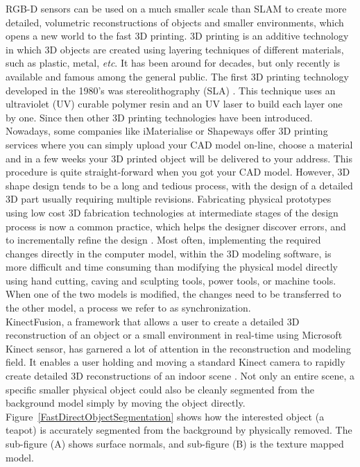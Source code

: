 RGB-D sensors can be used on a much smaller scale than SLAM to create more detailed, volumetric reconstructions of objects and smaller environments, which opens a new world to the fast 3D printing. 3D printing is an additive technology in which 3D objects are created using layering techniques of different materials, such as plastic, metal, \textit{etc}.  It has been around for decades, but only recently is available and famous among the general public. The first 3D printing technology developed in the 1980's was stereolithography (SLA) \cite{Patent3Dprinting86}. This technique uses an ultraviolet (UV) curable polymer resin and an UV laser to build each layer one by one. Since then other 3D printing technologies have been introduced. Nowadays, some companies like iMaterialise or Shapeways offer 3D printing services where you can simply upload your CAD model on-line, choose a material and in a few weeks your 3D printed object will be delivered to your address. This procedure is quite straight-forward when you got your CAD model. However, 3D shape design tends to be a long and tedious process, with the design of a detailed 3D part usually requiring multiple revisions. Fabricating physical prototypes using low cost 3D fabrication technologies at intermediate stages of the design process is now a common practice, which helps the designer discover errors, and to incrementally refine the design \cite{3DModelingForPrinting15}. Most often, implementing the required changes directly in the computer model, within the 3D modeling software, is more difficult and time consuming than modifying the physical model directly using hand cutting, caving and sculpting tools, power tools, or machine tools. When one of the two models is modified, the changes need to be transferred to the other model, a process we refer to as synchronization. 
\\\indent
KinectFusion, a framework that allows a user to create a detailed 3D reconstruction of an object or a small environment in real-time using Microsoft Kinect sensor, has garnered a lot of attention in the reconstruction and modeling field. It enables a user holding and moving a standard Kinect camera to rapidly create detailed 3D reconstructions of an indoor scene \cite{KinectFusionIzadi_2011}. Not only an entire scene, a specific smaller physical object could also be cleanly segmented from the background model simply by moving the object directly. Figure~\ref{FastDirectObjectSegmentation} shows how the interested object (a teapot) is accurately segmented from the background by physically removed. The sub-figure (A) shows surface normals, and sub-figure (B) is the texture mapped model. %
